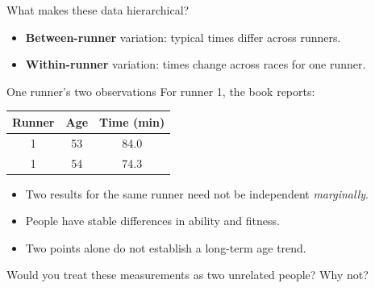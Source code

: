 \documentclass[aspectratio=43,11pt]{beamer}
\begin{document}
\begin{frame}{What makes these data hierarchical?}
\centering
{}
\vspace{3mm}
\begin{itemize}
\item \textbf{Between-runner} variation: typical times differ across runners.
\item \textbf{Within-runner} variation: times change across races for one runner.
\end{itemize}
\end{frame}

\begin{frame}{One runner's two observations}
For runner 1, the book reports:
\begin{center}
\begin{tabular}{ccc}\toprule Runner & Age & Time (min)\\\midrule 1 & 53 & 84.0\\ 1 & 54 & 74.3\\\bottomrule\end{tabular}
\end{center}
\begin{itemize}
\item Two results for the same runner need not be independent \emph{marginally}.
\item People have stable differences in ability and fitness.
\item Two points alone do not establish a long-term age trend.
\end{itemize}
\begin{block}{}
Would you treat these measurements as two unrelated people? Why not?
\end{block}
\end{frame}
\end{document}
